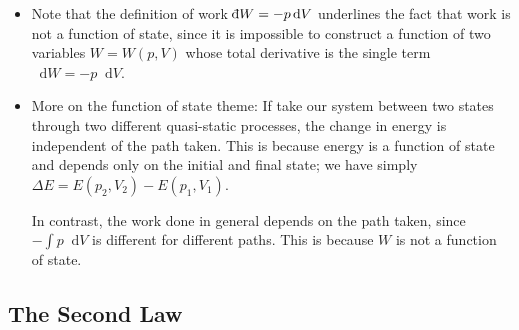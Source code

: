 \documentclass[11pt, a4paper]{article}
\newcommand{\diff}{\mathop{}\!\mathrm{d}} %
\newcommand{\dbar}{{\mathchar '26\mkern -11mu \mathrm{d}}} %
\begin{document}
\begin{itemize}
	\item Note that the definition of work $ \dbar W = - p \diff V $ underlines the fact that work is not a function of state, since it is impossible to construct a function of two variables $ W = W(p, V) $ whose total derivative is the single term $ \diff W = - p \diff V $.
	
	\item More on the function of state theme: If take our system between two states through two different quasi-static processes, the change in energy is independent of the path taken. This is because energy is a function of state and depends only on the initial and final state; we have simply $ \Delta E = E(p_{2}, V_{2}) - E(p_{1}, V_{1})  $.
	
	In contrast, the work done in general depends on the path taken, since $ - \int p \diff V $ is different for different paths. This is because $ W $ is not a function of state.
	
\end{itemize}

\subsection{The Second Law}
\end{document}
